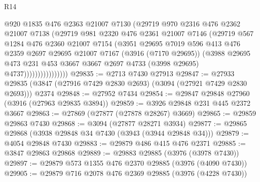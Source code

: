 \begin{lexlean}{R14}
\begin{coremodule}
                          @920
                          @1835
                          @476
                          @2363
                          @21007
                          @7130
                          (@29719
                            @970
                            @2316
                            @476
                            @2362
                            @21007
                            @7138
                            (@29719
                              @981
                              @2320
                              @476
                              @2361
                              @21007
                              @7146
                              (@29719
                                @567
                                @1284
                                @476
                                @2360
                                @21007
                                @7154
                                (@3951
                                  @29695
                                  @7019
                                  @596
                                  @413
                                  @476
                                  @2359
                                  @2697
                                  @29695
                                  @21007
                                  @7167
                                  (@3916 (@7170 @29695))
                                  (@3988
                                    @29695
                                    @473
                                    @231
                                    @453
                                    @3667
                                    @3667
                                    @2697
                                    @4733
                                    (@3998 @29695)
                                    @4737))))))))))))))))
@29835 := @2713 @7430 @27913
@29847 := @27933 @29835 (@3847 (@27916 @7429 @2830 @2693) (@3094 (@27921 @7429 @2830 @2693))) @2374
@29848 := @27952 @7434
@29854 := @29847 @29848 @27960 (@3916 (@27963 @29835 @3894))
@29859 := @3926 @29848 @231 @445 @2372 @3667
@29863 := @27869 (@27877 (@27878 @28267) @3669)
@29865 := @29859 @29863 @7430
@29868 := @3094 (@27877 @28271 @3934)
@29877 := @29865 @29868 (@3938 @29848 @34 @7430 (@3943 (@3944 @29848 @34)))
@29879 := @4054 @29848 @7430
@29883 := @29879 @486 @415 @476 @2371
@29885 := @3847 @29863 @29868
@29889 := @29883 @29885 (@3976 (@3978 @7430))
@29897 := @29879 @573 @1355 @476 @2370 @29885 (@3976 (@4090 @7430))
@29905 := @29879 @716 @2078 @476 @2369 @29885 (@3976 (@4228 @7430))

\end{coremodule}
\end{lexlean}
